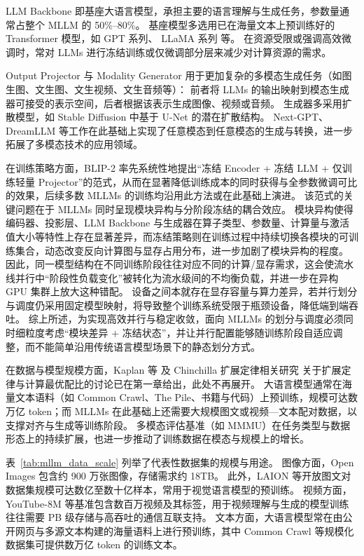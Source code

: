 LLM Backbone 即基座大语言模型，承担主要的语言理解与生成任务，参数量通常占整个 MLLM 的 50\%--80\%\cite{blip2,llava2023}。
基座模型多选用已在海量文本上预训练好的 Transformer 模型，如 GPT 系列\cite{brown2020gpt3,gpt2}、
LLaMA 系列\cite{llama3} 等。
在资源受限或强调高效微调时，常对 LLMs 进行冻结训练或仅微调部分层来减少对计算资源的需求。

Output Projector 与 Modality Generator 用于更加复杂的多模态生成任务（如图生图、文生图、文生视频、文生音频等）：
前者将 LLMs 的输出映射到模态生成器可接受的表示空间，后者根据该表示生成图像、视频或音频。
生成器多采用扩散模型，如 Stable Diffusion\cite{stable_diffusion} 中基于 U-Net\cite{unet} 的潜在扩散结构。
Next-GPT\cite{nextgpt}、DreamLLM\cite{dreamllm} 等工作在此基础上实现了任意模态到任意模态的生成与转换，进一步拓展了多模态技术的应用领域。

在训练策略方面，BLIP-2\cite{blip2} 率先系统性地提出“冻结 Encoder + 冻结 LLM + 仅训练轻量 Projector”的范式，从而在显著降低训练成本的同时获得与全参数微调可比的效果，后续多数 MLLMs 的训练均沿用此方法或在此基础上演进。
该范式的关键问题在于 MLLMs 同时呈现模块异构与分阶段冻结的耦合效应。
模块异构使得编码器、投影层、LLM Backbone 与生成器在算子类型、参数量、计算量与激活值大小等特性上存在显著差异，而冻结策略则在训练过程中持续切换各模块的可训练集合，动态改变反向计算图与显存占用分布，进一步加剧了模块异构的程度。
因此，同一模型结构在不同训练阶段往往对应不同的计算/显存需求，这会使流水线并行中“阶段性负载变化”被转化为流水级间的不均衡负载，并进一步在异构 GPU 集群上放大这种错配。
设备之间本就存在显存容量与算力差异，若并行划分与调度仍采用固定模型映射，将导致整个训练系统受限于瓶颈设备，降低端到端吞吐。
综上所述，为实现高效并行与稳定收敛，面向 MLLMs 的划分与调度必须同时细粒度考虑“模块差异 + 冻结状态”，并让并行配置能够随训练阶段自适应调整，而不能简单沿用传统语言模型场景下的静态划分方式。

在数据与模型规模方面，Kaplan 等\cite{kaplan2020scaling} 及 Chinchilla 扩展定律相关研究\cite{chinchilla2022,beyond_chinchilla2024} 关于扩展定律与计算最优配比的讨论已在第一章给出，此处不再展开。
大语言模型通常在海量文本语料（如 Common Crawl、The Pile\cite{pile2020}、书籍与代码）上预训练，规模可达数万亿 token；而 MLLMs 在此基础上还需要大规模图文或视频—文本配对数据，以支撑对齐与生成等训练阶段。
多模态评估基准（如 MMMU\cite{mmmu_benchmark2024}）在任务类型与数据形态上的持续扩展\cite{mllm_datacentric2024}，也进一步推动了训练数据在模态与规模上的增长。

表~\ref{tab:mllm_data_scale} 列举了代表性数据集的规模与用途。
图像方面，Open Images\cite{open_images} 包含约 900 万张图像，存储需求约 18TB。
此外，LAION\cite{laion5b2022} 等开放图文对数据集规模可达数亿至数十亿样本，常用于视觉语言模型的预训练。
视频方面，YouTube-8M\cite{youtube8m} 等基准包含数百万视频及其标签，用于视频理解与生成的模型训练往往需要 PB 级存储与高吞吐的通信互联支持。
文本方面，大语言模型常在由公开网页与多源文本构建的海量语料上进行预训练，其中 Common Crawl\cite{commoncrawl2022} 等规模化数据集可提供数万亿 token 的训练文本。

